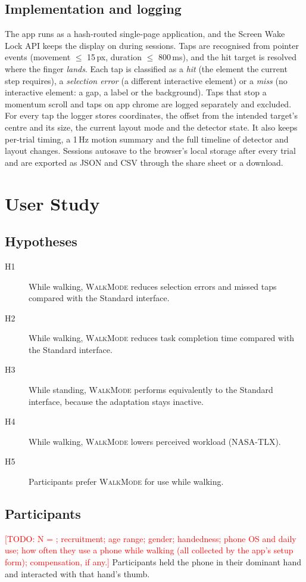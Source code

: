 \documentclass[sigconf,nonacm]{acmart}
\newcommand{\todo}[1]{\textcolor{red}{[TODO: #1]}}
\newcommand{\WM}{\textsc{WalkMode}}
\begin{document}
\subsection{Implementation and logging}
The app runs as a hash-routed single-page application, and the Screen Wake Lock API keeps the display on during sessions. Taps are recognised from pointer events (movement $\le$ 15\,px, duration $\le$ 800\,ms), and the hit target is resolved where the finger \emph{lands}. Each tap is classified as a \emph{hit} (the element the current step requires), a \emph{selection error} (a different interactive element) or a \emph{miss} (no interactive element: a gap, a label or the background). Taps that stop a momentum scroll and taps on app chrome are logged separately and excluded. For every tap the logger stores coordinates, the offset from the intended target's centre and its size, the current layout mode and the detector state. It also keeps per-trial timing, a 1\,Hz motion summary and the full timeline of detector and layout changes. Sessions autosave to the browser's local storage after every trial and are exported as JSON and CSV through the share sheet or a download.

\section{User Study}

\subsection{Hypotheses}
\begin{description}
  \item[H1] While walking, \WM{} reduces selection errors and missed taps compared with the Standard interface.
  \item[H2] While walking, \WM{} reduces task completion time compared with the Standard interface.
  \item[H3] While standing, \WM{} performs equivalently to the Standard interface, because the adaptation stays inactive.
  \item[H4] While walking, \WM{} lowers perceived workload (NASA-TLX).
  \item[H5] Participants prefer \WM{} for use while walking.
\end{description}

\subsection{Participants}
\todo{N = \NP{}; recruitment; age range; gender; handedness; phone OS and daily use; how often they use a phone while walking (all collected by the app's setup form); compensation, if any.} Participants held the phone in their dominant hand and interacted with that hand's thumb.
\end{document}
